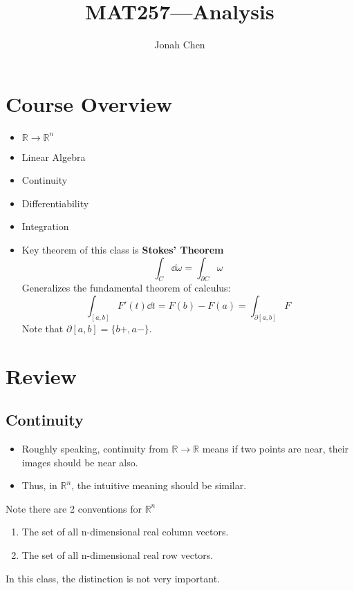 \documentclass[a4paper]{article}
\title{MAT257---Analysis}
\author{Jonah Chen}
\numberwithin{equation}{section}
\begin{document}
\maketitle
\tableofcontents
\section{Course Overview}
\begin{itemize}
    \item $\mathbb R\to\mathbb R^n$
    \item Linear Algebra
    \item Continuity
    \item Differentiability
    \item Integration
    \item Key theorem of this class is \textbf{Stokes' Theorem}
    \begin{equation}
        \int_C\dd\omega=\int_{\partial C}\omega
    \end{equation}
    Generalizes the fundamental theorem of calculus:
    \begin{equation}
        \int_{[a,b]}F'(t)\dd t=F(b)-F(a)=\int_{\partial[a,b]}F
    \end{equation}
    Note that $\partial[a,b]=\{b+, a-\}$.
\end{itemize}

\section{Review}
\subsection{Continuity}
\begin{itemize}
    \item Roughly speaking, continuity from $\mathbb R\to\mathbb R$ means if two points are near, their images should be near also.
    \item Thus, in $\mathbb R^n$, the intuitive meaning should be similar.
\end{itemize}


Note there are 2 conventions for $\mathbb R^n$
\begin{enumerate}
    \item The set of all n-dimensional real column vectors.
    \item The set of all n-dimensional real row vectors.
\end{enumerate}
In this class, the distinction is not very important.
\end{document}
